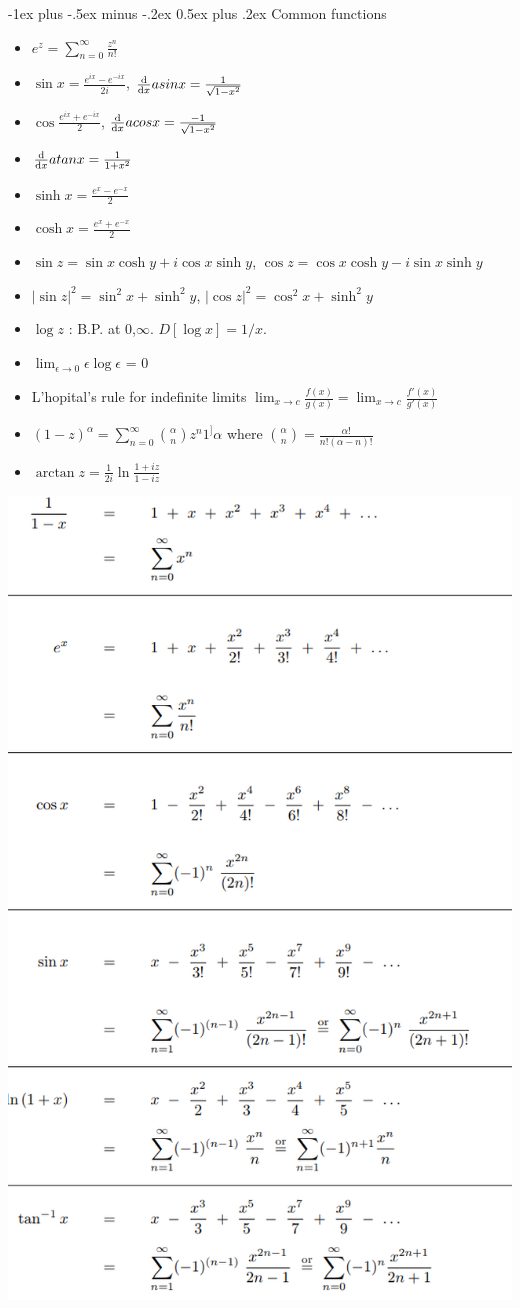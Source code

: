 \documentclass{article}
\makeatletter
\theoremstyle{definition}
\renewcommand{\section}{\@startsection{section}{1}{0mm}%
	{-1ex plus -.5ex minus -.2ex}%
	{0.5ex plus .2ex}%
	{\normalfont\large\bfseries}}
\makeatother
\begin{document}
\begin{multicols}{3}
\section{Common functions}
\begin{itemize}
	\item $e^z = \sum_{n=0}^\infty \frac{z^n}{n!}$
	\item $\sin x = \frac{e^{ix} - e^{-ix}}{2i}$, $\dv{x} asin x = \frac{1}{\sqrt{1-x^2}}$
	\item $\cos \frac{e^{ix} + e^{-ix}}{2}$, $\dv{x} acos x = \frac{-1}{\sqrt{1-x^2}}$
	\item $\dv{x} atan x = \frac{1}{1+x^2}$
	\item $\sinh x = \frac{e^{x} - e^{-x}}{2}$
	\item $\cosh x = \frac{e^{x} + e^{-x}}{2}$
	\item $\sin z = \sin x \cosh y + i \cos x \sinh y$, $\cos z = \cos x \cosh y - i \sin x \sinh y$
	\item $|\sin z|^2 = \sin ^2 x + \sinh ^2 y$, $|\cos z|^2 = \cos ^2 x + \sinh ^2 y$
	\item $\log z$ :  B.P. at 0,$\infty$. $D[\log x] = 1/x$. 
	\item $\lim_{\epsilon \to 0} $$\epsilon \log \epsilon$ = 0
	\item L'hopital's rule for indefinite limits $ \lim _{x\to c}{\frac {f(x)}{g(x)}}=\lim _{x\to c}{\frac {f'(x)}{g'(x)}}$
	\item $(1-z)^\alpha = \sum_{n=0}^{\infty} \binom{\alpha}{n} z^n 1^]\alpha $ where $\binom{\alpha}{n} = \frac{\alpha!}{n!(\alpha-n)!}$
	\item $\arctan z  = \frac{1}{2i} \ln \frac{1 + iz}{1-iz} $
\end{itemize}

\includegraphics[width=0.7\linewidth]{common_taylor_series}




\end{multicols}
\end{document}
